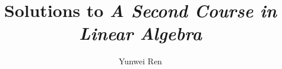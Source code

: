 

\title{Solutions to \textit{A Second Course in Linear Algebra}}
\author{Yunwei Ren}
\date{}


\maketitle
\tableofcontents

\newpage



